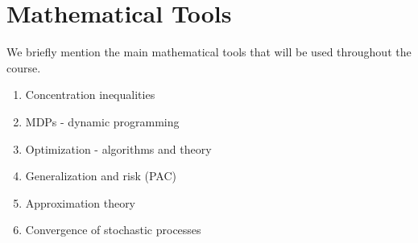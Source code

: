\section{Mathematical Tools}
We briefly mention the main mathematical tools that will be used throughout the course.
\begin{enumerate}
  \item Concentration inequalities
  \item MDPs - dynamic programming
  \item Optimization - algorithms and theory
  \item Generalization and risk (PAC)
  \item Approximation theory
  \item Convergence of stochastic processes
\end{enumerate}

%

